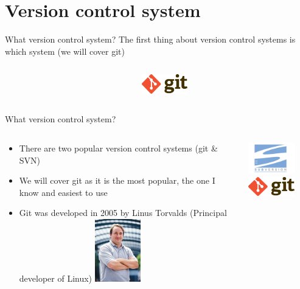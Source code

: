 \documentclass[10pt]{beamer}
\begin{document}
\section{Version control system}



\begin{frame}[fragile]{What version control system?}
The first thing about version control systems is which system (we will cover git) \\
\begin{columns}[T]
\begin{column}{.8\textwidth}
\end{column}
\begin{column}{.2\textwidth}
\includegraphics[width=2cm]{Figs/Git-logo}
\end{column}
\end{columns}
\end{frame}


\begin{frame}[fragile]{What version control system?}
\begin{columns}[T]
\begin{column}{.8\textwidth}
\begin{itemize}
\item There are two popular version control systems (git \& SVN)
\item We will cover git as it is the most popular, the one I know and easiest to use
\item Git was developed in 2005 by Linus Torvalds (Principal developer of Linux)
\includegraphics[width=2cm]{Figs/Linus_Torvalds}
\end{itemize}
\end{column}
\begin{column}{.2\textwidth}
\includegraphics[width=2cm]{Figs/SVN} \newline \newline
\includegraphics[width=2cm]{Figs/Git-logo}
\end{column}
\end{columns}
\end{frame}
\end{document}

